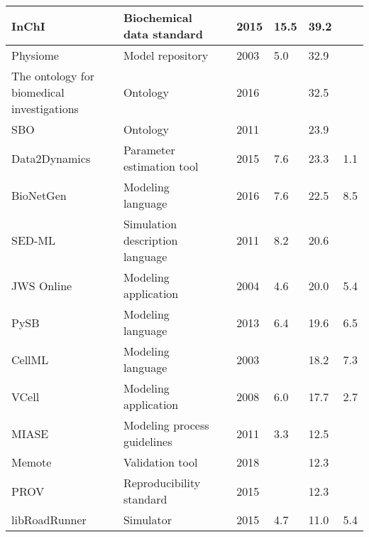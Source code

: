 \begin{longtable}{L{2.2cm}L{4cm}L{1cm}L{0.8cm}R{1.1cm}R{1cm}R{1cm}}
\midrule
\small{InChI} &\small{Biochemical data standard} &\cite{Heller2015InChIIdentifier.} &\small{2015} &\small{15.5} &\small{39.2} &\small{}\\
\midrule
\small{Physiome} &\small{Model repository} &\cite{hunter2003integration} &\small{2003} &\small{5.0} &\small{32.9} &\small{}\\
\midrule
\small{The ontology for biomedical investigations} &\small{Ontology} &\cite{Bandrowski2016TheInvestigations} &\small{2016} &\small{} &\small{32.5} &\small{}\\
\midrule
\small{SBO} &\small{Ontology} &\cite{Courtot2011ControlledBiology.} &\small{2011} &\small{} &\small{23.9} &\small{}\\
\midrule
\small{Data2Dynamics} &\small{Parameter estimation tool} &\cite{Raue2015Data2Dynamics:Systems} &\small{2015} &\small{7.6} &\small{23.3} &\small{1.1}\\
\midrule
\small{BioNetGen} &\small{Modeling language} &\cite{Harris2016BioNetGenModeling} &\small{2016} &\small{7.6} &\small{22.5} &\small{8.5}\\
\midrule
\small{SED-ML} &\small{Simulation description language} &\cite{Waltemath2011ReproducibleLanguage} &\small{2011} &\small{8.2} &\small{20.6} &\small{}\\
\midrule
\small{JWS Online} &\small{Modeling application} &\cite{Olivier2004Web-basedOnline} &\small{2004} &\small{4.6} &\small{20.0} &\small{5.4}\\
\midrule
\small{PySB} &\small{Modeling language} &\cite{Lopez2013ProgrammingPySB} &\small{2013} &\small{6.4} &\small{19.6} &\small{6.5}\\
\midrule
\small{CellML} &\small{Modeling language} &\cite{Cuellar2003AnLanguage} &\small{2003} &\small{} &\small{18.2} &\small{7.3}\\
\midrule
\small{VCell} &\small{Modeling application} &\cite{moraru2008virtual} &\small{2008} &\small{6.0} &\small{17.7} &\small{2.7}\\
\midrule
\small{MIASE} &\small{Modeling process guidelines} &\cite{Waltemath2011MinimumMIASE} &\small{2011} &\small{3.3} &\small{12.5} &\small{}\\
\midrule
\small{Memote} &\small{Validation tool} &\cite{Lieven2018Memote:Suite} &\small{2018} &\small{} &\small{12.3} &\small{}\\
\midrule
\small{PROV} &\small{Reproducibility standard} &\cite{Moreau2015ThePROV} &\small{2015} &\small{} &\small{12.3} &\small{}\\
\midrule
\small{libRoadRunner} &\small{Simulator} &\cite{Somogyi2015LibRoadRunner:Library.} &\small{2015} &\small{4.7} &\small{11.0} &\small{5.4}\\

\end{longtable}
